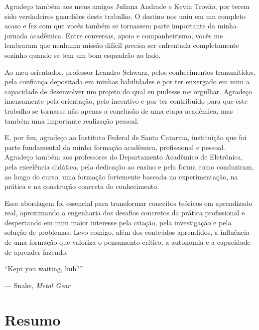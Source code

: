 \documentclass[a4paper,12pt]{article}
\begin{document}
Agradeço também aos meus amigos Juliana Andrade e Kevin Trovão, por
terem sido verdadeiros guardiões deste trabalho. O destino nos uniu em
um completo acaso e fez com que vocês também se tornassem parte
importante da minha jornada acadêmica. Entre conversas, apoio e
companheirismo, vocês me lembraram que nenhuma missão difícil precisa
ser enfrentada completamente sozinho quando se tem um bom esquadrão ao
lado.

Ao meu orientador, professor Leandro Schwarz, pelos conhecimentos
transmitidos, pela confiança depositada em minhas habilidades e por ter
enxergado em mim a capacidade de desenvolver um projeto do qual eu
pudesse me orgulhar. Agradeço imensamente pela orientação, pelo incentivo
e por ter contribuído para que este trabalho se tornasse não apenas a
conclusão de uma etapa acadêmica, mas também uma importante realização
pessoal.

E, por fim, agradeço ao Instituto Federal de Santa Catarina, instituição
que foi parte fundamental da minha formação acadêmica, profissional e
pessoal. Agradeço também aos professores do Departamento Acadêmico de
Eletrônica, pela excelência didática, pela dedicação ao ensino e pela
forma como conduziram, ao longo do curso, uma formação fortemente
baseada na experimentação, na prática e na construção concreta do
conhecimento.

Essa abordagem foi essencial para transformar conceitos teóricos em
aprendizado real, aproximando a engenharia dos desafios concretos da
prática profissional e despertando em mim maior interesse pela criação,
pela investigação e pela solução de problemas. Levo comigo, além dos
conteúdos aprendidos, a influência de uma formação que valoriza o
pensamento crítico, a autonomia e a capacidade de aprender fazendo.

\clearpage
\thispagestyle{empty}
\vspace*{\fill}
\begin{flushright}
\begin{minipage}{0.50\textwidth}
\setlength{\parindent}{0pt}
\raggedleft
``Kept you waiting, huh?''

\vspace{0.5cm}

--- Snake, \emph{Metal Gear}
\end{minipage}
\end{flushright}
\vspace*{\fill}

\clearpage
\section*{Resumo}
\end{document}
